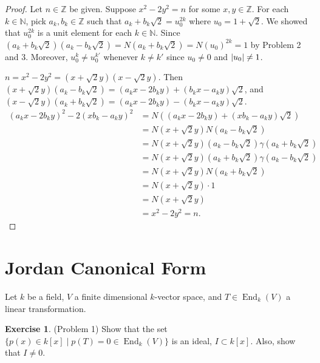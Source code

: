 \documentclass[12pt, psamsfonts]{amsart}
\theoremstyle{definition}
\newtheorem*{exer}{Exercise}
\theoremstyle{remark}
\DeclareMathOperator{\End}{End}
\numberwithin{equation}{section}
\begin{document}
\begin{proof}
  Let $n \in \mathbb{Z}$ be given.
  Suppose $x^2 - 2y^2 = n$ for some $x, y \in \mathbb{Z}$.
  For each $k \in \mathbb{N}$, pick $a_k, b_k \in \mathbb{Z}$ such that $a_k + b_k\sqrt{2} = u_0^{2k}$ where $u_0 = 1 + \sqrt{2}$.
  We showed that $u_0^{2k}$ is a unit element for each $k \in \mathbb{N}$.
  Since $(a_k + b_k\sqrt{2})(a_k - b_k\sqrt{2}) = N(a_k + b_k\sqrt{2}) = N(u_0)^{2k} = 1$ by Problem 2 and 3.
  Moreover, $u_0^k \ne u_0^{k'}$ whenever $k \ne k'$ since $u_0 \ne 0$ and $\abs{u_0} \ne 1$.

  $n = x^2 - 2y^2 = (x + \sqrt{2}y)(x - \sqrt{2}y)$.
  Then $(x + \sqrt{2}y)(a_k - b_k\sqrt{2}) = (a_kx - 2b_ky) + (b_kx - a_ky)\sqrt{2}$, and $(x - \sqrt{2}y)(a_k + b_k\sqrt{2}) = (a_kx - 2b_ky) - (b_kx - a_ky)\sqrt{2}$.
  \begin{align*}
    (a_kx - 2b_ky)^2 - 2(xb_k - a_ky)^2
      &= N((a_kx - 2b_ky) + (xb_k - a_ky)\sqrt{2}) \\
      &= N(x + \sqrt{2}y)N(a_k - b_k\sqrt{2}) \\
      &= N(x + \sqrt{2}y)(a_k - b_k\sqrt{2})\gamma(a_k + b_k\sqrt{2}) \\
      &= N(x + \sqrt{2}y)(a_k + b_k\sqrt{2})\gamma(a_k - b_k\sqrt{2}) \\
      &= N(x + \sqrt{2}y)N(a_k + b_k\sqrt{2}) \\
      &= N(x + \sqrt{2}y) \cdot 1 \\
      &= N(x + \sqrt{2}y) \\
      &= x^2 - 2y^2 = n.
  \end{align*}

\end{proof}

\section{Jordan Canonical Form}

Let $k$ be a field, $V$ a finite dimensional $k$-vector space, and $T \in \End_k(V)$ a linear transformation.

\begin{exer}{(Problem 1)}
  Show that the set $\{ p(x) \in k[x] \mid p(T) = 0 \in \End_k(V) \}$ is an ideal, $I \subset k[x]$.
  Also, show that $I \ne 0$.
\end{exer}
\end{document}
